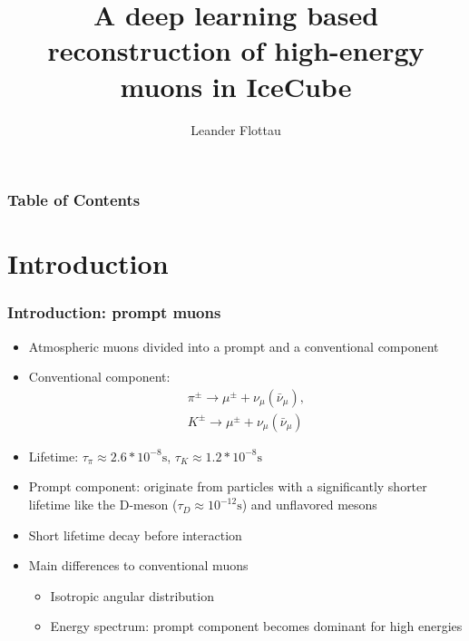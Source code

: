 \documentclass[aspectratio=1610, 9pt]{beamer}
\title{A deep learning based reconstruction of high-energy muons in IceCube}
\author{Leander Flottau}
\begin{document}
\maketitle
\begin{frame}
  \frametitle{Table of Contents}
  \tableofcontents
\end{frame}  
\section{Introduction}
\begin{frame}
  \frametitle{Introduction: prompt muons}
  \begin{itemize}
    \item Atmospheric muons divided into a prompt and a conventional component
    \item Conventional component: 
    \begin{align}
      \pi^{\pm} \rightarrow \mu^{\pm}+\nu_{\mu}(\bar{\nu}_{\mu}), \\
      K^{\pm} \rightarrow \mu^{\pm}+\nu_{\mu}(\bar{\nu}_{\mu})
    \end{align}
    \item Lifetime: $\tau_{\pi}\approx 2.6*10^{-8} \si{\second}$, $\tau_{K}\approx 1.2*10^{-8} \si{\second}$
    \item Prompt component: originate from particles with a significantly shorter lifetime like the D-meson ($\tau_{D}\approx 10^{-12}\si{\second}$) and unflavored mesons
    \item Short lifetime \rightarrow decay before interaction
    \item Main differences to conventional muons
    \begin{itemize}
      \item Isotropic angular distribution
      \item Energy spectrum: prompt component becomes dominant for high energies
    \end{itemize}
  \end{itemize}
\end{frame}
\end{document}
